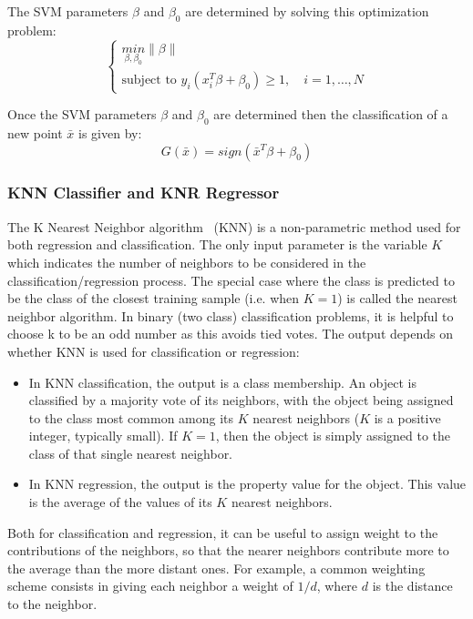 The SVM parameters $\beta$ and $\beta_0$  are determined by solving this optimization problem:
\begin{equation}
\left\{\begin{matrix}
\underset{\beta,\beta_0}{min} \left \| \beta \right \|\\ 
\text{subject to } y_i(x_{i}^{T}\beta+\beta_0)\geq 1 , \quad i=1,\dots,N
\end{matrix}\right.
\end{equation}

Once the SVM parameters $\beta$ and $\beta_0$ are determined then the classification of a new point $\bar{x}$ is given by:
\begin{equation}
G(\bar{x})=sign(\bar{x}^T\beta+\beta_0)
\end{equation}


\subsubsection{KNN Classifier and KNR Regressor}
\label{sec:KNN_KNR}
The K Nearest Neighbor algorithm~\cite{altman_KNN} (KNN) is a non-parametric method used for both regression and classification. The only input parameter is the variable $K$ which indicates the number of neighbors to be considered in the classification/regression process. The special case where the class is predicted to be the class of the closest training sample (i.e. when $K = 1$) is called the nearest neighbor algorithm. In binary (two class) classification problems, it is helpful to choose k to be an odd number as this avoids tied votes. The output depends on whether KNN is used for classification or regression:
\begin{itemize}
\item In KNN classification, the output is a class membership. An object is classified by a majority vote of its neighbors, with the object being assigned to the class most common among its $K$ nearest neighbors ($K$ is a positive integer, typically small). If $K = 1$, then the object is simply assigned to the class of that single nearest neighbor.
\item In KNN regression, the output is the property value for the object. This value is the average of the values of its $K$ nearest neighbors.
\end{itemize}
Both for classification and regression, it can be useful to assign weight to the contributions of the neighbors, so that the nearer neighbors contribute more to the average than the more distant ones. For example, a common weighting scheme consists in giving each neighbor a weight of $1/d$, where $d$ is the distance to the neighbor.

